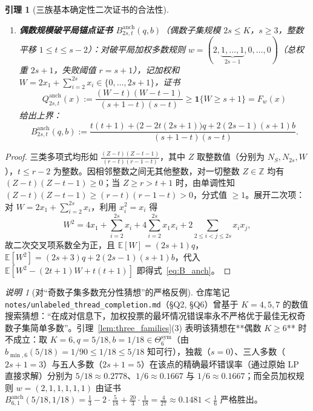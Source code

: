 \documentclass[11pt,a4paper]{article}
\newtheorem{lemma}[theorem]{引理}
\theoremstyle{definition}
\theoremstyle{remark}
\newtheorem{remark}[theorem]{说明}
\begin{document}
\begin{lemma}[三族基本确定性二次证书的合法性]
\begin{enumerate}
  \item \textbf{偶数规模破平局锚点证书 $B^{\mathrm{anch}}_{2s, t}(q, b)$}（偶数子集规模 $2s \le K$，$s \ge 3$，整数平移 $1 \le t \le s - 2$）：对破平局加权多数规则 $w = (2, \underbrace{1, \dots, 1}_{2s-1}, 0, \dots, 0)$（总权重 $2s+1$，失败阈值 $r = s+1$），记加权和 $W = 2x_1 + \sum_{i=2}^{2s} x_i \in \{0, \dots, 2s+1\}$，证书
  \[
    Q^{\mathrm{anch}}_{2s, t}(x) := \frac{(W - t)(W - t - 1)}{(s + 1 - t)(s - t)} \ge \mathbf{1}\{W \ge s + 1\} = F_w(x)
  \]
  给出上界：
  \begin{equation}\label{eq:B_anch}
    B^{\mathrm{anch}}_{2s, t}(q, b) := \frac{t(t+1) + \bigl(2 - 2t(2s+1)\bigr) q + 2(2s-1)(s+1) b}{(s + 1 - t)(s - t)}.
  \end{equation}
\end{enumerate}
\end{lemma}
\begin{proof}
三类多项式均形如 $\frac{(Z - t)(Z - t - 1)}{(r - t)(r - 1 - t)}$，其中 $Z$ 取整数值（分别为 $N_S, N_{2s}, W$），$t \le r - 2$ 为整数。因相邻整数之间无其他整数，对一切整数 $Z \in \mathbb{Z}$ 均有 $(Z - t)(Z - t - 1) \ge 0$；当 $Z \ge r > t + 1$ 时，由单调性知 $(Z - t)(Z - t - 1) \ge (r - t)(r - 1 - t) > 0$，分式值 $\ge 1$。展开二次项：对 $W = 2x_1 + \sum_{i=2}^{2s} x_i$，利用 $x_i^2 = x_i$ 得
\[
  W^2 = 4x_1 + \sum_{i=2}^{2s} x_i + 4\sum_{i=2}^{2s} x_1 x_i + 2\sum_{2 \le i < j \le 2s} x_i x_j,
\]
故二次交叉项系数全为正，且 $\mathbb{E}[W] = (2s+1)q$，$\mathbb{E}[W^2] = (2s+3)q + 2(2s-1)(s+1)b$，代入 $\mathbb{E}[W^2 - (2t+1)W + t(t+1)]$ 即得式~\eqref{eq:B_anch}。
\end{proof}

\begin{remark}[对“奇数子集多数充分性猜想”的严格反例]
仓库笔记 \texttt{notes/unlabeled\_thread\_completion.md}（§Q2, §Q6）曾基于 $K=4, 5, 7$ 的数值搜索猜想：“在成对信息下，加权投票的最坏情况错误率永不严格优于最佳无权奇数子集简单多数”。引理~\ref{lem:three_families}(3) 表明该猜想在**偶数 $K \ge 6$** 时不成立：取 $K = 6, q = 5/18, b = 1/18 \in \Theta^{\mathrm{sym}}_6$（由 $b_{\min, 6}(5/18) = 1/90 \le 1/18 \le 5/18$ 知可行），独裁（$s=0$）、三人多数（$2s+1=3$）与五人多数（$2s+1=5$）在该点的精确最坏错误率（通过原始 LP 直接求解）分别为 $5/18 \approx 0.2778$、$1/6 \approx 0.1667$ 与 $1/6 \approx 0.1667$；而全员加权规则 $w = (2, 1, 1, 1, 1, 1)$ 由证书 $B^{\mathrm{anch}}_{6, 1}(5/18, 1/18) = \frac{1}{3} - 2\cdot\frac{5}{18} + \frac{20}{3}\cdot\frac{1}{18} = \frac{4}{27} \approx 0.1481 < \frac{1}{6}$ 严格胜出。
\end{remark}
\end{document}
